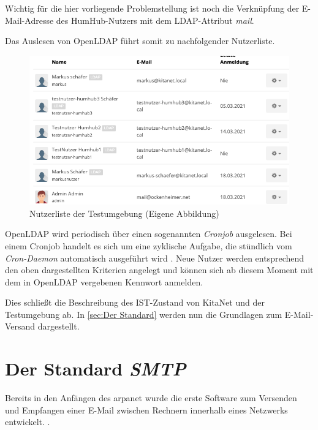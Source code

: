 Wichtig für die hier vorliegende Problemstellung ist noch die Verknüpfung der E-Mail-Adresse des HumHub-Nutzers mit dem LDAP-Attribut \textit{mail}. 

Das Auslesen von OpenLDAP führt somit zu nachfolgender Nutzerliste.

\begin{figure}[h]
  \centering
  \includegraphics[width=1.0\textwidth]{res/nutzerliste.png}
  \caption{Nutzerliste der Testumgebung (Eigene Abbildung)}
  \label{fig:Nutzerliste}
\end{figure}

OpenLDAP wird periodisch über einen sogenannten \textit{Cronjob} ausgelesen. Bei einem Cronjob handelt es sich um eine zyklische Aufgabe, die \zb stündlich vom \textit{Cron-Daemon} automatisch ausgeführt wird \citep{cronjob}. Neue Nutzer werden entsprechend den oben dargestellten Kriterien angelegt und können sich ab diesem Moment mit dem in OpenLDAP vergebenen Kennwort anmelden.

Dies schließt die Beschreibung des IST-Zustand von KitaNet und der Testumgebung ab. In \autoref{sec:Der Standard} werden nun die Grundlagen zum E-Mail-Versand dargestellt.

\chapter{Der Standard \textit{SMTP}}
\label{sec:Der Standard}
Bereits in den Anfängen des \ac{arpanet} wurde die erste Software zum Versenden und Empfangen einer E-Mail zwischen Rechnern innerhalb eines Netzwerks entwickelt.  \citep[][]{historyinternet}.

